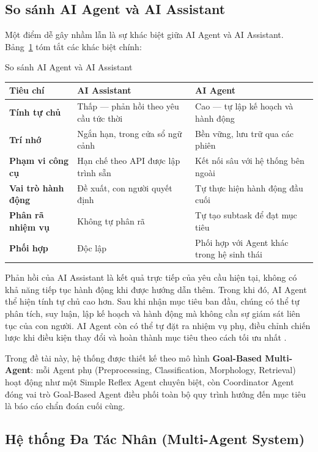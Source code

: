 \subsection{So sánh AI Agent và AI Assistant}

Một điểm dễ gây nhầm lẫn là sự khác biệt giữa AI Agent và AI Assistant. Bảng~\ref{tab:agent_vs_assistant} tóm tắt các khác biệt chính:

\begin{table}[H]{So sánh AI Agent và AI Assistant}
\label{tab:agent_vs_assistant}
\centering
\begin{tabularx}{\textwidth}{>{\bfseries}p{3.2cm} X X}
\toprule
\textbf{Tiêu chí} & \textbf{AI Assistant} & \textbf{AI Agent} \\
\midrule
Tính tự chủ & Thấp --- phản hồi theo yêu cầu tức thời & Cao --- tự lập kế hoạch và hành động \\[4pt]
Trí nhớ & Ngắn hạn, trong cửa sổ ngữ cảnh & Bền vững, lưu trữ qua các phiên \\[4pt]
Phạm vi công cụ & Hạn chế theo API được lập trình sẵn & Kết nối sâu với hệ thống bên ngoài \\[4pt]
Vai trò hành động & Đề xuất, con người quyết định & Tự thực hiện hành động đầu cuối \\[4pt]
Phân rã nhiệm vụ & Không tự phân rã & Tự tạo subtask để đạt mục tiêu \\[4pt]
Phối hợp & Độc lập & Phối hợp với Agent khác trong hệ sinh thái \\
\bottomrule
\end{tabularx}
\end{table}

Phản hồi của AI Assistant là kết quả trực tiếp của yêu cầu hiện tại, không có khả năng tiếp tục hành động khi được hướng dẫn thêm. Trong khi đó, AI Agent thể hiện tính tự chủ cao hơn. Sau khi nhận mục tiêu ban đầu, chúng có thể tự phân tích, suy luận, lập kế hoạch và hành động mà không cần sự giám sát liên tục của con người. AI Agent còn có thể tự đặt ra nhiệm vụ phụ, điều chỉnh chiến lược khi điều kiện thay đổi và hoàn thành mục tiêu theo cách tối ưu nhất \cite{ibm2025}.

Trong đề tài này, hệ thống được thiết kế theo mô hình \textbf{Goal-Based Multi-Agent}: mỗi Agent phụ (Preprocessing, Classification, Morphology, Retrieval) hoạt động như một Simple Reflex Agent chuyên biệt, còn Coordinator Agent đóng vai trò Goal-Based Agent điều phối toàn bộ quy trình hướng đến mục tiêu là báo cáo chẩn đoán cuối cùng.

\subsection{Hệ thống Đa Tác Nhân (Multi-Agent System)}

